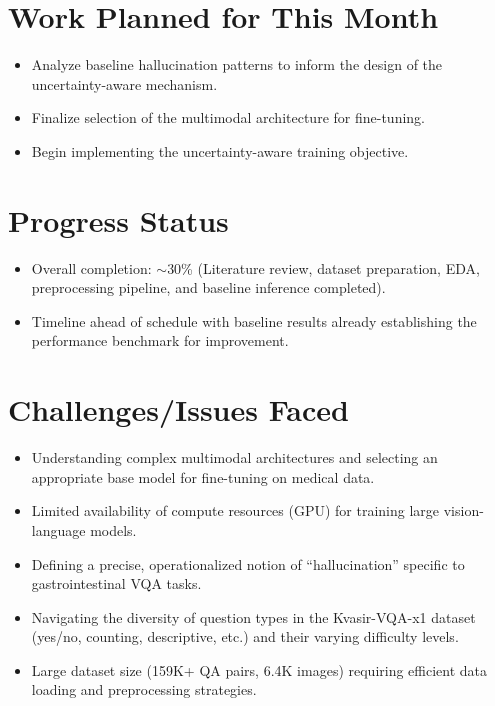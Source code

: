\documentclass[12pt,a4paper]{article}
\begin{document}
\section{Work Planned for This Month}
\begin{itemize}[leftmargin=*]
    \item Analyze baseline hallucination patterns to inform the design of the uncertainty-aware mechanism.
    \item Finalize selection of the multimodal architecture for fine-tuning.
    \item Begin implementing the uncertainty-aware training objective.
\end{itemize}

\section{Progress Status}
\begin{itemize}[leftmargin=*]
    \item Overall completion: $\sim$30\% (Literature review, dataset preparation, EDA, preprocessing pipeline, and baseline inference completed).
    \item Timeline ahead of schedule with baseline results already establishing the performance benchmark for improvement.
\end{itemize}

\section{Challenges/Issues Faced}
\begin{itemize}[leftmargin=*]
    \item Understanding complex multimodal architectures and selecting an appropriate base model for fine-tuning on medical data.
    \item Limited availability of compute resources (GPU) for training large vision-language models.
    \item Defining a precise, operationalized notion of ``hallucination'' specific to gastrointestinal VQA tasks.
    \item Navigating the diversity of question types in the Kvasir-VQA-x1 dataset (yes/no, counting, descriptive, etc.) and their varying difficulty levels.
    \item Large dataset size (159K+ QA pairs, 6.4K images) requiring efficient data loading and preprocessing strategies.
\end{itemize}
\end{document}
